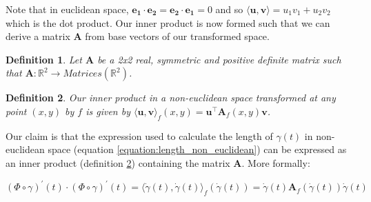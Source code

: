 \documentclass[12pt]{article}
\newtheorem{definition}{Definition}
\begin{document}
	\noindent Note that in euclidean space, $\bm{e_1} \cdot \bm{e_2} = \bm{e_2} \cdot \bm{e_1} = 0$ and so $\langle \bm{u}, \bm{v}\rangle = u_1v_1 + u_2v_2$ which is the dot product. Our inner product is now formed such that we can derive a matrix $\bm{A}$ from base vectors of our transformed space. 
	
	\begin{definition}
		\label{defintion:A_matrix}
		Let $\bm{A}$ be a 2x2 real, symmetric and positive definite matrix such that $\bm{A}: \mathbb{R}^2 \rightarrow Matrices(\mathbb{R}^2)$. 
	\end{definition}
	
	\begin{definition}
		\label{definition:inner_product_a_matrix}
		Our inner product in a non-euclidean space transformed at any point $(x, y)$ by $f$ is given by $\langle \bm{u}, \bm{v} \rangle _f(x, y) = \bm{u}^{\intercal}\bm{A}_f(x, y)\bm{v}$.
	\end{definition}
	
	\noindent Our claim is that the expression used to calculate the length of $\gamma(t)$ in non-euclidean space (equation \ref{equation:length_non_euclidean}) can be expressed as an inner product (definition \ref{definition:inner_product_a_matrix}) containing the matrix $\bm{A}$. More formally:
	
	\begin{equation}
		\label{equation:claim}
		(\Phi \circ \gamma)^{\prime}(t) \cdot (\Phi \circ \gamma)^{\prime}(t) = \langle \dot \gamma(t), \dot \gamma(t) \rangle_f(\dot \gamma(t)) =  \dot \gamma(t) \bm{A}_f(\dot \gamma(t)) \dot \gamma(t)
	\end{equation}
	
\end{document}
